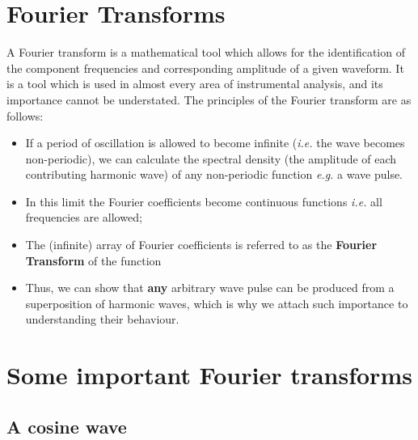 \documentclass[
]{book}
\providecommand{\tightlist}{%
  \setlength{\itemsep}{0pt}\setlength{\parskip}{0pt}}
\begin{document}
\hypertarget{sec:ch11-fouriertransforms}{%
\section{Fourier Transforms}\label{sec:ch11-fouriertransforms}}

A Fourier transform is a mathematical tool which allows for the identification of the component frequencies and corresponding amplitude of a given waveform. It is a tool which is used in almost every area of instrumental analysis, and its importance cannot be understated. The principles of the Fourier transform are as follows:

\begin{itemize}
\tightlist
\item
  If a period of oscillation is allowed to become infinite (\emph{i.e.} the wave becomes non-periodic), we can calculate the spectral density (the amplitude of each contributing harmonic wave) of any non-periodic function \emph{e.g.} a wave pulse.
\item
  In this limit the Fourier coefficients become continuous functions \emph{i.e.} all frequencies are allowed;
\item
  The (infinite) array of Fourier coefficients is referred to as the \textbf{Fourier Transform} of the function
\item
  Thus, we can show that \textbf{any} arbitrary wave pulse can be produced from a superposition of harmonic waves, which is why we attach such importance to understanding their behaviour.
\end{itemize}

\hypertarget{sec:ch11-importantfouriertransforms}{%
\section{Some important Fourier transforms}\label{sec:ch11-importantfouriertransforms}}

\hypertarget{sec:ch11-ftcosine}{%
\subsection{A cosine wave}\label{sec:ch11-ftcosine}}
\end{document}
